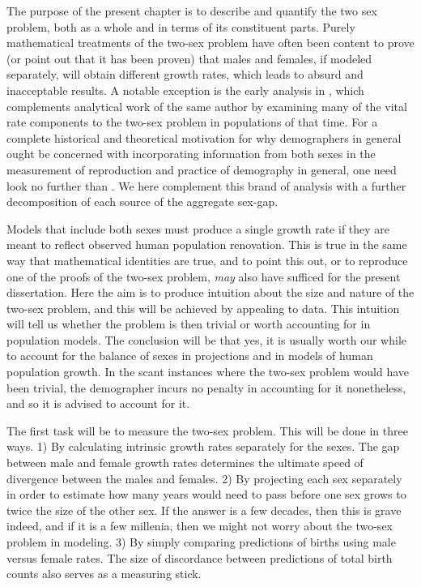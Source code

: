 \label{ch:Measuring}
The purpose of the present chapter is to describe and quantify the two sex
problem, both as a whole and in terms of its constituent parts. Purely
mathematical treatments of the two-sex problem have often been content to 
prove (or point out that it has been proven) that males and females,
if modeled separately, will obtain different growth rates, which leads to
absurd and inacceptable results. A notable exception is the early analysis in
\citet{karmel1948analysis}, which complements analytical work of the same author
\citep{karmel1947relations,karmel1948relations} by examining many of the vital
rate components to the two-sex problem in populations of that time. For a
complete historical and theoretical motivation for why demographers in general
ought be concerned with incorporating information from both sexes in the measurement of reproduction
and practice of demography in general, one need look no further than
\citet{francisco1996dissertation}. We here complement this brand of analysis
with a further decomposition of each source of the aggregate sex-gap.

Models that include both sexes must produce a single growth 
rate if they are meant to reflect observed human population renovation. 
This is true in the same way that mathematical identities are true, and to 
point this out, or to reproduce one of the proofs of the two-sex problem,
\textit{may} also have sufficed for the present dissertation. Here the aim is to produce intuition 
about the size and nature of the two-sex problem, and this will be
achieved by appealing to data. This intuition will tell us whether the 
problem is then trivial or worth accounting for in
population models. The conclusion will be that yes, it is usually worth our
while to account for the balance of sexes in projections and in models of human
population growth. In the scant instances where the two-sex problem would have
been trivial, the demographer incurs no penalty in accounting for it
nonetheless, and so it is advised to account for it.

The first task will be to measure the two-sex problem. This will be done in
three ways. 1) By calculating intrinsic growth rates separately for the sexes.
The gap between male and female growth rates determines the ultimate speed of
divergence between the males and females. 2) By projecting each sex separately
in order to estimate how many years would need to pass before one sex grows to
twice the size of the other sex. If the answer is a few decades, then this is
grave indeed, and if it is a few millenia, then we might not worry about the
two-sex problem in modeling. 3) By simply comparing predictions of births using
male versus female rates. The size of discordance between predictions of total
birth counts also serves as a measuring stick.

